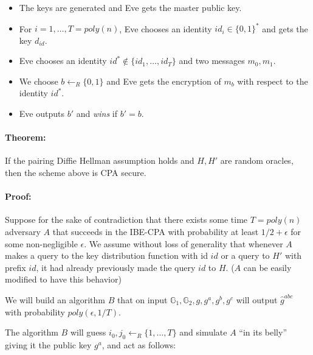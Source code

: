 \begin{itemize}
\tightlist
\item
  The keys are generated and Eve gets the master public key.
\item
  For \(i=1,\ldots,T=poly(n)\), Eve chooses an identity
  \(id_i \in \{0,1\}^*\) and gets the key \(d_{id}\).
\item
  Eve chooses an identity \(id^* \not\in \{id_1,\ldots,id_T\}\) and two
  messages \(m_0,m_1\).
\item
  We choose \(b\leftarrow_R\{0,1\}\) and Eve gets the encryption of
  \(m_b\) with respect to the identity \(id^*\).
\item
  Eve outputs \(b'\) and \emph{wins} if \(b'=b\).
\end{itemize}

\paragraph{Theorem:} If the pairing Diffie Hellman assumption holds and
\(H,H'\) are random oracles, then the scheme above is CPA secure.

\paragraph{Proof:} Suppose for the sake of contradiction that there
exists some time \(T=poly(n)\) adversary \(A\) that succeeds in the
IBE-CPA with probability at least \(1/2+\epsilon\) for some
non-negligible \(\epsilon\). We assume without loss of generality that
whenever \(A\) makes a query to the key distribution function with id
\(id\) or a query to \(H'\) with prefix \(id\), it had already
previously made the query \(id\) to \(H\). (\(A\) can be easily modified
to have this behavior)

We will build an algorithm \(B\) that on input
\(\mathbb{G}_1,\mathbb{G}_2,g,g^a,g^b,g^c\) will output
\(\hat{g}^{abc}\) with probability \(poly(\epsilon,1/T)\).

The algorithm \(B\) will guess \(i_0, j_0 \leftarrow_R \{1,\ldots, T\}\)
and simulate \(A\) ``in its belly'' giving it the public key \(g^a\),
and act as follows:

